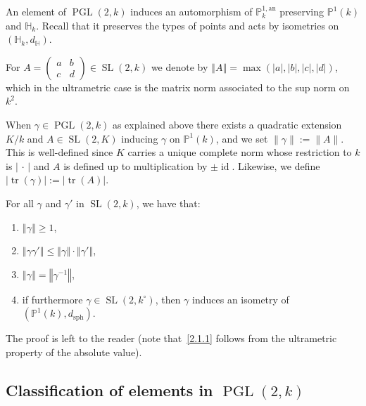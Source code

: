 \documentclass[10pt]{amsart}
\theoremstyle{definition}\newtheorem{defi}[theo]{Definition}\newtheorem{rema}[theo]{Remark}\newtheorem{exam}[theo]{Example}\newtheorem{exem}[theo]{Example}\newtheorem{nota}[theo]{Notation}
\DeclareMathOperator{\tr}{tr}
\DeclareMathOperator{\id}{id}
\DeclareMathOperator{\sph}{sph}
\DeclareMathOperator{\SL}{SL}
\DeclareMathOperator{\PGL}{PGL}
\newcommand{\hh}{\mathbb{H}}
\newcommand{\norm}[1]{\left\Vert#1\right\Vert}
\newcommand{\abs}[1]{\left\vert#1\right\vert}
\newcommand{\pu}{{\mathbb{P}^1}}
\newcommand{\PP}{\mathbb{P}}
\newcommand{\berk}{{\mathbb{P}^{1, \mathrm{an}}_k}}
\newcommand{\lrpar}[1]{\left(#1\right)}
\newcommand{\SLk}{\SL(2,k)}
\newcommand{\PGLk}{\PGL(2, k)}
\newcommand{\inv}{^{-1}}
\newcommand*{\romanenumi}{\renewcommand*{\theenumi}{\roman{enumi}}}
\begin{document}
An element of $\PGLk$ induces an automorphism of $\berk$ preserving $\pu(k)$ and $\hh_k$. Recall that it preserves the types of points and acts by isometries on $(\hh_k,d_\hh)$.

For $A = \lrpar{\begin{smallmatrix} a & b \\ c & d
\end{smallmatrix}} \in \SLk$ we denote by
$\norm{A} = \max\lrpar{\abs{a}, \abs{b}, \abs{c}, \abs{d}}$, which in the ultrametric case is the matrix norm associated to the sup norm on $ k^2$.

When $\gamma \in \PGL(2,k)$ as explained above there exists a quadratic extension $K/k$ and $A \in \SL(2,K)$ inducing $\gamma$ on $\PP^1(k)$, and we set $\| \gamma \| := \| A\|$. This is well-defined since $K$ carries a unique complete norm whose restriction to $k$ is $|{\,\cdot\,}|$ and $A$ is defined up to multiplication by $\pm \id$. Likewise, we define $\abs{\tr(\gamma)} := \abs{\tr(A)}$.

\begin{prop}
For all $\gamma$ and $\gamma' $ in $\SLk$, we have that:
\begin{enumerate}%
\item \label{2.1.1} $\norm{\gamma}\geq 1$,
\item \label{2.1.2} $\norm{\gamma \gamma'}\leq \norm{\gamma}\cdot\norm{\gamma'}$,
\item \label{2.1.3} $\norm{\gamma} = \norm{\gamma\inv}$,
\item \label{2.1.4} if furthermore $\gamma\in \SL(2,k^\circ)$, then $\gamma$ induces an isometry of $(\PP^1(k),d_{\sph})$.
\end{enumerate}
\end{prop}

The proof is left to the reader (note that~\eqref{2.1.1} follows from the ultrametric property of the absolute value).


\subsection{Classification of elements in \texorpdfstring{$\PGL(2,k)$}{PGL(2,k)}}
\end{document}
